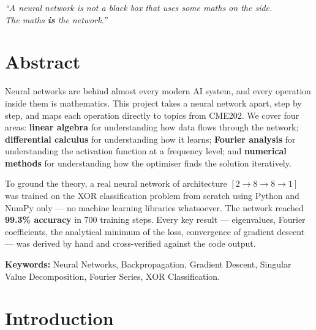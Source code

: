 \documentclass[12pt,a4paper]{article}
\begin{document}
\begin{titlepage}
\vspace{0.6cm}
\begin{tcolorbox}[
  colback=rowgray, colframe=navrachana,
  arc=4pt, boxrule=0.6pt,
  left=8pt, right=8pt, top=4pt, bottom=4pt
]
\centering\small
\textit{``A neural network is not a black box that uses some maths on the side.}\\
\textit{The maths \textbf{is} the network.''}
\end{tcolorbox}

\end{titlepage}

\tableofcontents
\newpage

\section{Abstract}

Neural networks are behind almost every modern AI system, and every operation inside them is mathematics. This project takes a neural network apart, step by step, and maps each operation directly to topics from CME202. We cover four areas: \textbf{linear algebra} for understanding how data flows through the network; \textbf{differential calculus} for understanding how it learns; \textbf{Fourier analysis} for understanding the activation function at a frequency level; and \textbf{numerical methods} for understanding how the optimiser finds the solution iteratively.

To ground the theory, a real neural network of architecture $[2 \to 8 \to 8 \to 1]$ was trained on the XOR classification problem from scratch using Python and NumPy only --- no machine learning libraries whatsoever. The network reached \textbf{99.3\% accuracy} in 700 training steps. Every key result --- eigenvalues, Fourier coefficients, the analytical minimum of the loss, convergence of gradient descent --- was derived by hand and cross-verified against the code output.

\medskip
\textbf{Keywords:} Neural Networks, Backpropagation, Gradient Descent, Singular Value Decomposition, Fourier Series, XOR Classification.

\newpage

\section{Introduction}
\end{document}
